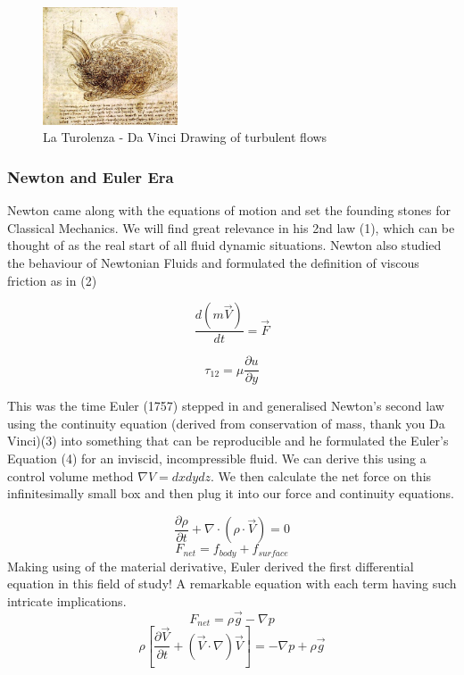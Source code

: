 \documentclass[12pt]{article}
\begin{document}
\begin{figure}[hbt!]
  \centering
  \includegraphics[width=4cm]{plot1.jpeg}
  \caption{La Turolenza - Da Vinci \cite{bib2}Drawing of turbulent flows \label{fig:fig3}}
\end{figure}
\FloatBarrier 
\subsubsection{Newton and Euler Era}
Newton came along with the equations of motion and set the founding stones for Classical Mechanics. We will find great relevance in his 2nd law (1), which can be thought of as the real start of all fluid dynamic situations. Newton also studied the behaviour of Newtonian Fluids and formulated the definition of viscous friction \cite{bib4} as in (2)

\begin{equation}
    \frac{d(m \Vec{V})}{dt}= \Vec{F} 
\end{equation}


\begin{equation}
    \tau_{12} = \mu \frac{\partial u}{\partial y}
\end{equation}

This was the time Euler (1757) stepped in and generalised Newton's second law using the continuity equation (derived from conservation of mass, thank you Da Vinci)(3) into something that can be reproducible and he formulated the Euler's Equation (4) for an inviscid, incompressible fluid. We can derive this using a control volume method $\nabla V = dx dy dz$. We then calculate the net force on this infinitesimally small box and then plug it into our force and continuity equations.

\begin{equation}
    \frac{\partial \rho}{\partial t} + \nabla \cdot(\rho \cdot \Vec{V}) = 0
\end{equation}
\begin{equation*}
    F_{net} = f_{body} +f_{surface}
\end{equation*}
Making using of the material derivative, Euler derived the first differential equation in this field of study! A remarkable equation with each term having such intricate implications.
\begin{equation*}
    F_{net} =  \rho \Vec{g} - \nabla p 
\end{equation*}
\begin{equation}
    \rho [ \frac{\partial \Vec{V}}{\partial t} + (\Vec{V} \cdot \nabla)\Vec{V}] = - \nabla p + \rho \Vec{g}
\end{equation}
\end{document}
